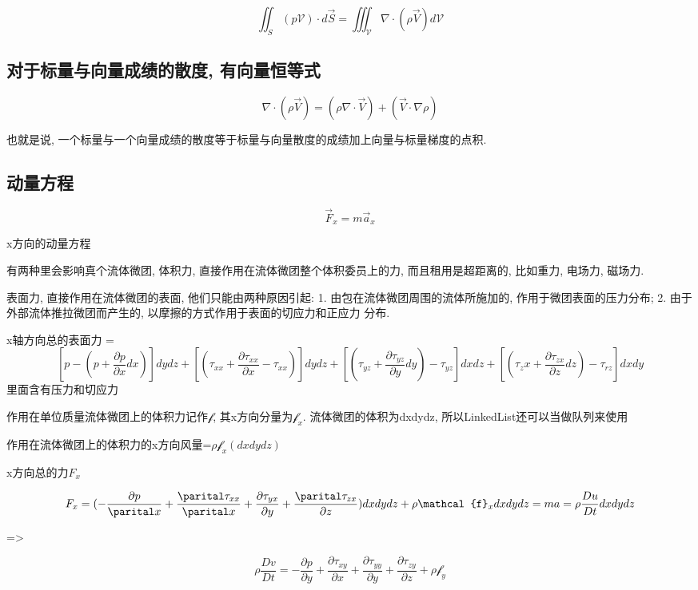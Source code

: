 \documentclass[UTF8]{ctexart}
\begin{document}
$$
	\iint_{S}(p\mathcal{V})\cdot d\vec{S} = \iiint_{\mathcal{V}} \nabla \cdot (\rho \vec{V}) d \mathcal{V}
$$
\subsection{对于标量与向量成绩的散度, 有向量恒等式}

$$
	\nabla \cdot (\rho \vec{V}) = (\rho \nabla \cdot \vec{V}) + (\vec{V} \cdot \nabla \rho)
$$

也就是说, 一个标量与一个向量成绩的散度等于标量与向量散度的成绩加上向量与标量梯度的点积.
\subsection{动量方程}

$$
	\vec{F}_{x} = m \vec{a}_x
$$

x方向的动量方程

有两种里会影响真个流体微团, 体积力, 直接作用在流体微团整个体积委员上的力, 而且租用是超距离的, 比如重力, 电场力, 磁场力.

表面力, 直接作用在流体微团的表面, 他们只能由两种原因引起: 1. 由包在流体微团周围的流体所施加的, 作用于微团表面的压力分布; 2. 由于外部流体推拉微团而产生的, 以摩擦的方式作用于表面的切应力和正应力
分布.

x轴方向总的表面力 = $$
	[p-(p+\frac{\partial p}{\partial x}dx)]dydz + [(\tau_{xx} + \frac{\partial \tau_{xx}}{\partial x} - \tau_{xx} )]dydz +
	[(\tau_{yz} + \frac{\partial \tau_{yz}}{\partial y} dy) - \tau _{yz}]dxdz + [(\tau_zx + \frac{\partial \tau_{zx}}{\partial z}dz) - \tau_{rz}]dxdy
$$
里面含有压力和切应力



作用在单位质量流体微团上的体积力记作$\mathcal{f}$, 其x方向分量为$\mathcal{f}_x$. 流体微团的体积为dxdydz, 所以LinkedList还可以当做队列来使用

作用在流体微团上的体积力的x方向风量=$\rho \mathcal{f}_x(dxdydz)$

x方向总的力$F_x$

$$
	F_x=(-\frac{\partial p}{\parital x} + \frac{\parital \tau_{xx}}{\parital x} + \frac{\partial \tau_{yx}}{\partial y} +
	\frac{\parital \tau_{zx}}{\partial z})dxdydz + \rho \mathcal{f}_xdxdydz = ma = \rho \frac{Du}{Dt} dxdydz
$$

=>

$$
	\rho \frac{Dv}{Dt} = -\frac{\partial p}{\partial y} + \frac{\partial \tau_{xy}}{\partial x} + \frac{\partial \tau_{yy}}{\partial y} + \frac{\partial \tau_{zy}}{\partial  z} + \rho \mathcal{f}_y
$$
\end{document}
